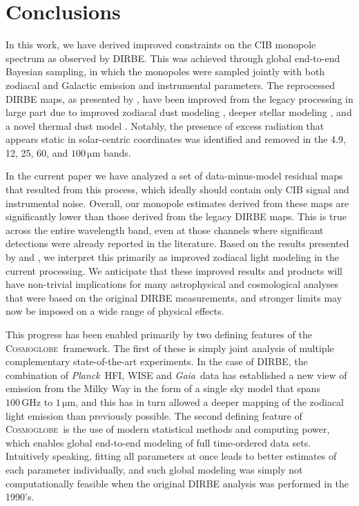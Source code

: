 \documentclass{aa}
\def\Planck{\textit{Planck}}
\def\Gaia{\textit{Gaia}}
\newcommand{\cosmoglobe}{\textsc{Cosmoglobe}}
\begin{document}
\section{Conclusions}
\label{sec:conclusions}

In this work, we have derived improved constraints on the CIB monopole spectrum as observed by DIRBE. This was achieved through global end-to-end Bayesian sampling, in which the monopoles were sampled jointly with both zodiacal and Galactic emission and instrumental parameters. The reprocessed DIRBE maps, as presented by \citet{CG02_01}, have been improved from the legacy processing in large part due to improved zodiacal dust modeling \citep{CG02_02}, deeper stellar modeling \citep{CG02_04}, and a novel thermal dust model \citep{CG02_05}. Notably, the presence of excess radiation that appears static in solar-centric coordinates was identified and removed in the 4.9, 12, 25, 60, and $100\,\mathrm{\mu m}$ bands.


In the current paper we have analyzed a set of data-minus-model residual maps that resulted from this process, which ideally should contain only CIB signal and instrumental noise. Overall, our monopole estimates derived from these maps are significantly lower than those derived from the legacy DIRBE maps. This is true across the entire wavelength band, even at those channels where significant detections were already reported in the literature. Based on the results presented by \citet{CG02_01} and \citet{CG02_02}, we interpret this primarily as improved zodiacal light modeling in the current processing. We anticipate that these improved results and products will have non-trivial implications for many astrophysical and cosmological analyses that were based on the original DIRBE measurements, and stronger limits may now be imposed on a wide range of physical effects.

This progress has been enabled primarily by two defining features of the \cosmoglobe\ framework. The first of these is simply joint analysis of multiple complementary state-of-the-art experiments. In the case of DIRBE, the combination of \Planck\ HFI, WISE and \Gaia\ data has established a new view of emission from the Milky Way in the form of a single sky model that spans $100\,\mathrm{GHz}$ to $1\,\mathrm{\mu m}$, and this has in turn allowed a deeper mapping of the zodiacal light emission than previously possible. The second defining feature of \cosmoglobe\ is the use of modern statistical methods and computing power, which enables global end-to-end modeling of full time-ordered data sets. Intuitively speaking, fitting all parameters at once leads to better estimates of each parameter individually, and such global modeling was simply not computationally feasible when the original DIRBE analysis was performed in the 1990's.
\end{document}
